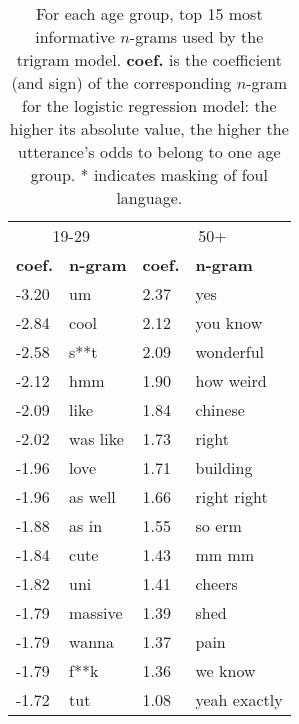 \begin{table}[b!]
    \centering
    \begin{tabular}{@{}l l @{\hspace*{25pt}} l l@{}}
    \toprule
    \multicolumn{2}{c}{19-29} & \multicolumn{2}{c}{50+}\\
    \textbf{coef.} & \textbf{n-gram} & \textbf{coef.} & \textbf{n-gram}\\
    \midrule
    -3.20 & um & 2.37 & yes\\
    -2.84 & cool & 2.12 & you know\\
    -2.58 & s**t & 2.09 & wonderful\\
    -2.12 & hmm & 1.90 & how weird\\
    -2.09 & like & 1.84 & chinese\\
    -2.02 & was like & 1.73 & right\\
    -1.96 & love & 1.71 & building\\
    -1.96 & as well & 1.66 & right right\\
    -1.88 & as in & 1.55 & so erm\\
    -1.84 & cute & 1.43 & mm mm\\
    -1.82 & uni & 1.41 & cheers\\
    -1.79 & massive & 1.39 & shed\\
    -1.79 & wanna & 1.37 & pain\\
    -1.79 & f**k & 1.36 & we know\\
    -1.72 & tut & 1.08 & yeah exactly\\
    \bottomrule
    \end{tabular}
    \caption{ For each age group, top 15 most informative $n$-grams used by the trigram model. \textbf{coef.} is the coefficient (and sign) of the corresponding $n$-gram for the logistic regression model: the higher its absolute value, the higher the utterance's odds to belong to one age group.
    * indicates masking of foul language.}
    \label{tab:top_ngrams_ws}
\end{table}

